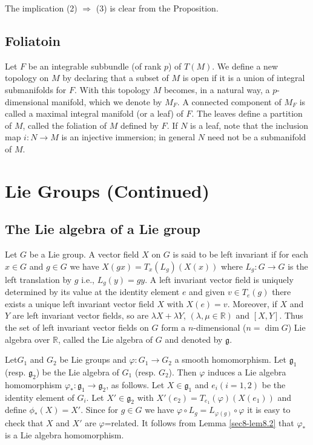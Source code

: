 The implication (2) $\Rightarrow$ (3) is clear from the Proposition.

\subsection*{Foliatoin}
\label{page38}

Let $F$ be an integrable subbundle (of rank $p$) of $T(M)$. We define a new topology on $M$ by declaring that a subset of $M$ is open if it is a union of integral submanifolds for $F$. With this topology $M$ becomes, in a natural way, a $p$-dimensional manifold, which we denote by $M_{F}$. A connected component of $M_{F}$ is called a maximal integral manifold (or a leaf) of $F$. The leaves define a partition of $M$, called the foliation of $M$ defined by $F$. If $N$ is a leaf, note that the inclusion map $i:N\to M$ is an injective immersion; in general $N$ need not be a submanifold of $M$.

\section{Lie Groups (Continued)}\label{sec9}

\subsection*{The Lie algebra of a Lie group}

Let $G$ be a Lie group. A vector field $X$ on $G$ is said to be left invariant if for each $x\in G$ and $g\in G$ we have $X(gx)=T_{x}(L_{g})(X(x))$ where $L_{g}:G\to G$ is the left translation by $g$ i.e., $L_{g}(y)=gy$. A left invariant vector field is uniquely determined by its value at the identity element $e$ and given $v\in T_{e}(g)$ there exists a unique left invariant vector field $X$ with $X(e)=v$. Moreover, if $X$ and $Y$ are left invariant vector fields, so are $\lambda X+\lambda Y$, $(\lambda,\mu\in \mathbb{R})$ and $[X,Y]$. Thus the set of left invariant vector fields on $G$ form a $n$-dimensional ($n=\dim G$) Lie algebra over $\mathbb{R}$, called the Lie algebra of $G$ and denoted by $\mathfrak{g}$.

Let\pageoriginale $G_{1}$ and $G_{2}$ be Lie groups and $\varphi:G_{1}\to G_{2}$ a smooth homomorphism. Let $\mathfrak{g}_{1}$ (resp. $\mathfrak{g}_{2}$) be the Lie algebra of $G_{1}$ (resp. $G_{2}$). Then $\varphi$ induces a Lie algebra homomorphism $\varphi_{*}:\mathfrak{g}_{1}\to \mathfrak{g}_{2}$, as follows. Let $X\in \mathfrak{g}_{1}$ and $e_{i}(i=1,2)$ be the identity element of $G_{i}$. Let $X'\in \mathfrak{g}_{2}$ with $X'(e_{2})=T_{e_{1}}(\varphi)(X(e_{1}))$ and define $\phi_{*}(X)=X'$. Since for $g\in G$ we have $\varphi\circ L_{g}=L_{\varphi(g)}\circ \varphi$ it is easy to check that $X$ and $X'$ are $\varphi$=related. It follows from Lemma \ref{sec8-lem8.2} that $\varphi_{*}$ is a Lie algebra homomorphism.

